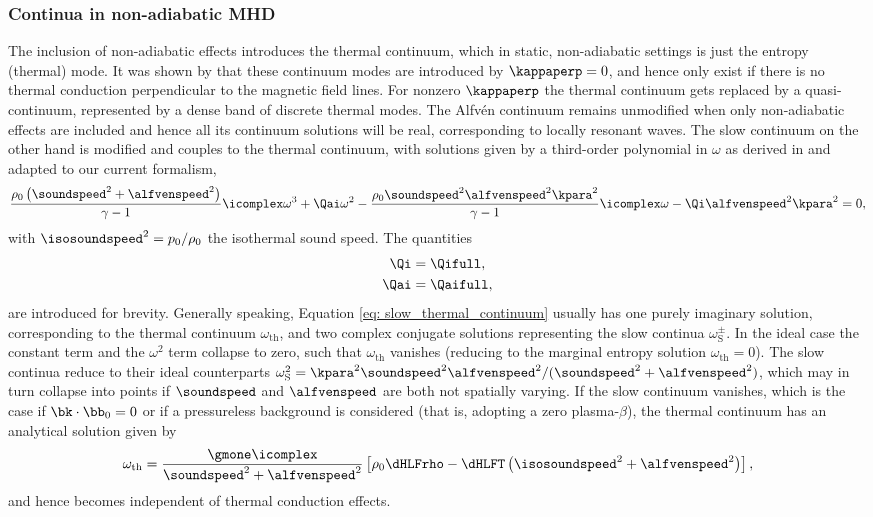 \subsubsection{Continua in non-adiabatic MHD}
The inclusion of non-adiabatic effects introduces the thermal continuum, which in static, non-adiabatic settings is just the entropy (thermal) mode. It was shown by \citet{vanderlinden1991} that these continuum modes are introduced by $\kappaperp = 0$, and hence only exist if there is no thermal conduction perpendicular to the magnetic field lines. For nonzero $\kappaperp$ the thermal continuum gets replaced by a quasi-continuum, represented by a dense band of discrete thermal modes. The Alfv\'en continuum remains unmodified when only non-adiabatic effects are included and hence all its continuum solutions will be real, corresponding to locally resonant waves. The slow continuum on the other hand is modified and couples to the thermal continuum, with solutions given by a third-order polynomial in $\omega$ as derived in \citet{vanderlinden1991} and adapted to our current formalism,
\begin{equation}	\label{eq: slow_thermal_continuum}
  \frac{\rho_0 \left(\soundspeed^2 + \alfvenspeed^2\right)}{\gamma - 1}\icomplex\omega^3
  + \Qai\omega^2
  - \frac{\rho_0 \soundspeed^2\alfvenspeed^2 \kpara^2}{\gamma - 1}\icomplex\omega
  - \Qi\alfvenspeed^2 \kpara^2 = 0,
\end{equation}
with $\isosoundspeed^2 = p_0 / \rho_0$ the isothermal sound speed. The quantities
\begin{equation}
  \begin{gathered}
	  \Qi = \Qifull, \\
    \Qai = \Qaifull,
  \end{gathered}
\end{equation}
are introduced for brevity. Generally speaking, Equation \eqref{eq: slow_thermal_continuum} usually has one purely imaginary solution, corresponding to the thermal continuum $\omega_\text{th}$, and two complex conjugate solutions representing the slow continua $\omega_\text{S}^\pm$. In the ideal case the constant term and the $\omega^2$ term collapse to zero, such that $\omega_\text{th}$ vanishes (reducing to the marginal entropy solution $\omega_\text{th} = 0$). The slow continua reduce to their ideal counterparts $\omega_\text{S}^2 = \kpara^2\soundspeed^2\alfvenspeed^2/(\soundspeed^2 + \alfvenspeed^2)$, which may in turn collapse into points if $\soundspeed$ and $\alfvenspeed$ are both not spatially varying. If the slow continuum vanishes, which is the case if $\bk \cdot \bb_0 = 0$ or if a pressureless background is considered (that is, adopting a zero plasma-$\beta$), the thermal continuum has an analytical solution given by
\begin{equation}
	\omega_\text{th} =
    \frac{\gmone\icomplex}{\soundspeed^2 + \alfvenspeed^2}
    \left[\rho_0\dHLFrho - \dHLFT\left(\isosoundspeed^2 + \alfvenspeed^2\right)\right],
\end{equation}
and hence becomes independent of thermal conduction effects.

